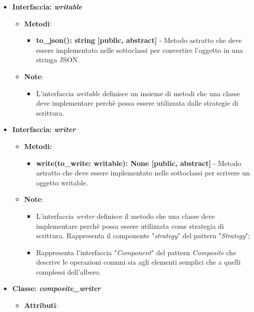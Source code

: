 \begin{itemize}
    \item{\textbf{Interfaccia: \textit{writable}}}
    \begin{itemize}
        \item\textbf{Metodi}: 
        \begin{itemize}
            \item \textbf{to\_json(): string [public, abstract]} - Metodo astratto che deve essere implementato nelle sottoclassi per convertire l'oggetto in una stringa JSON.
        \end{itemize}
        \item\textbf{Note}:
        \begin{itemize}
            \item L'interfaccia \textit{writable} definisce un insieme di metodi che una classe deve implementare perchè possa essere utilizzata dalle strategie di scrittura.
        \end{itemize}
    \end{itemize}
    \item{\textbf{Interfaccia: \textit{writer}}}
     \begin{itemize}
        \item \textbf{Metodi:}
         \begin{itemize}
            \item \textbf{write(to\_write: writable): None [public, abstract]} - Metodo astratto che deve essere implementato nelle sottoclassi per scrivere un oggetto writable.
        \end{itemize}
        \item\textbf{Note}:
        \begin{itemize}
            \item L'interfaccia \textit{writer} definisce il metodo che una classe deve implementare perchè possa essere utilizzata come strategia di scrittura. Rappresenta il componente "\textit{strategy}" del pattern "\textit{Strategy}";
            \item Rappresenta l'interfaccia "\textit{Component}" del pattern \textit{Composite} che descrive le operazioni comuni sia agli elementi semplici che a quelli complessi dell'albero.
        \end{itemize}
    \end{itemize}
    \item{\textbf{Classe: \textit{composite\_writer}}}
    \begin{itemize}
    \item\textbf{Attributi}:

\end{itemize}
\end{itemize}
